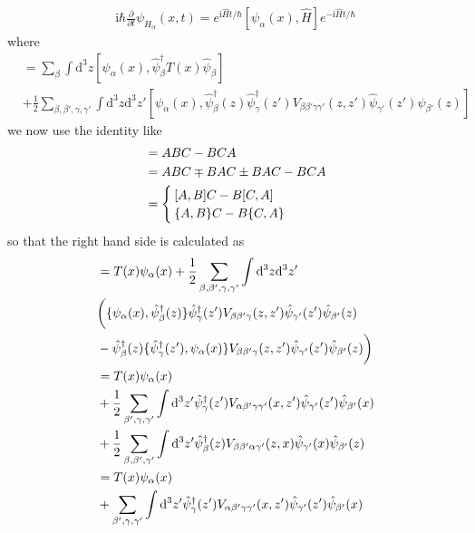 ﻿\documentclass[twoside]{book}
\numberwithin{equation}{section}
\begin{document}
\begin{align}
\mathrm{i}\hbar \frac{\partial}{\partial t} \psi_{H_{\alpha}}(x,t)=e^{\mathrm{i}\hat Ht/\hbar}[\psi_{\alpha}(x),\hat H]e^{-\mathrm{i}\hat Ht/\hbar} \nonumber
\end{align}
where
\begin{align}
[\psi_{\alpha}(x),\hat H]&=\sum_{\beta} \int \mathrm{d}^3z[\psi_{\alpha}(x),\hat \psi^{\dagger}_{\beta}T(x)\hat \psi_{\beta}] \nonumber \\
&+\frac{1}{2}\sum_{\beta,\beta',\gamma,\gamma'}\int \mathrm{d}^3z\mathrm{d}^3z'[\psi_{\alpha}(x),
\hat \psi^{\dagger}_{\beta}(z)\hat \psi^{\dagger}_{\gamma}(z')V_{\beta\beta'\gamma\gamma'}(z,z')\hat \psi_{\gamma'}(z')\hat \psi_{\beta'}(z)
] \nonumber
\end{align}
we now use the identity like
\begin{align}
[A,BC]&=ABC-BCA \nonumber \\	
&=ABC\mp BAC\pm BAC -BCA \nonumber \\
&=\begin{cases}
[A,B]C-B[C,A] \cr \{A,B\}C-B\{C,A\}
\end{cases}\nonumber
\end{align}
so that the right hand side is calculated as
\begin{align}
[\psi_{\alpha}(x),\hat H]&=T(x)\psi_{\alpha}(x)+\frac{1}{2}\sum_{\beta,\beta',\gamma,\gamma'}\int \mathrm{d}^3z\mathrm{d}^3z'
\nonumber \\
&\bigg{(}\{\psi_{\alpha}(x),
\hat \psi^{\dagger}_{\beta}(z)\}\hat \psi^{\dagger}_{\gamma}(z')V_{\beta\beta'\gamma}(z,z')\hat \psi_{\gamma'}(z')\hat \psi_{\beta'}(z)\nonumber \\
&-\hat \psi^{\dagger}_{\beta}(z)\{\hat \psi^{\dagger}_{\gamma}(z'),\psi_{\alpha}(x)\}V_{\beta\beta'\gamma}(z,z')\hat \psi_{\gamma'}(z')\hat \psi_{\beta'}(z) \bigg{)}\nonumber \\
&=T(x)\psi_{\alpha}(x)\nonumber \\
&+\frac{1}{2}\sum_{\beta',\gamma,\gamma'}\int \mathrm{d}^3z'\hat \psi^{\dagger}_{\gamma}(z')V_{\alpha\beta'\gamma\gamma'}(x,z')\hat \psi_{\gamma'}(z')\hat \psi_{\beta'}(x) \nonumber\\
&+\frac{1}{2}\sum_{\beta,\beta',\gamma'}\int \mathrm{d}^3z'\hat \psi^{\dagger}_{\beta}(z)V_{\beta\beta'\alpha\gamma'}(z,x)\hat \psi_{\gamma'}(x)\hat \psi_{\beta'}(z) \nonumber\\
&=T(x)\psi_{\alpha}(x) \nonumber \\
&+\sum_{\beta',\gamma,\gamma'}\int \mathrm{d}^3z'\hat \psi^{\dagger}_{\gamma}(z')V_{\alpha\beta'\gamma\gamma'}(x,z')\hat \psi_{\gamma'}(z')\hat \psi_{\beta'}(x) \nonumber
\end{align}
\end{document}
